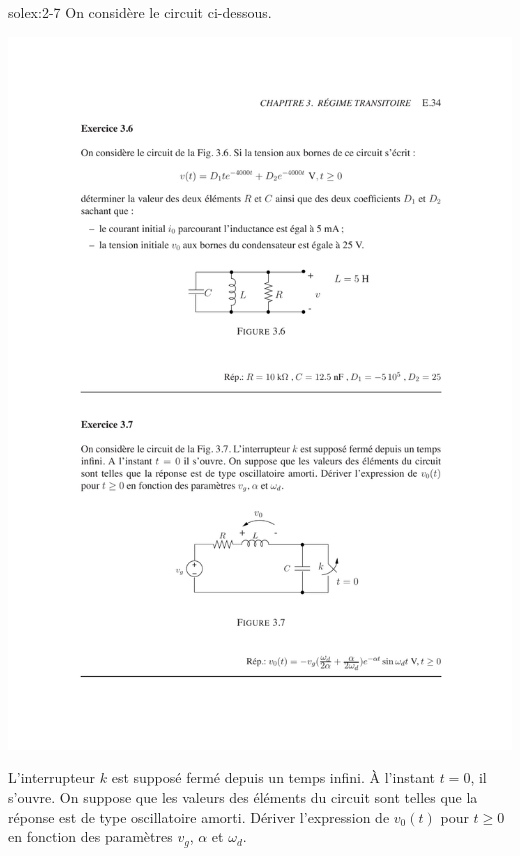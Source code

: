 \begin{exwithsol}{}{solex:2-7}
	\label{ex:2-7}
On consid\`ere le circuit ci-dessous. 
\begin{center}
	\includegraphics[width=0.5\linewidth]{exercices/ex-3-7}
\end{center}
L'interrupteur
$k$ est suppos\'e ferm\'e depuis un temps infini. \`A l'instant $t=0$, il
s'ouvre. On suppose que les valeurs des \'el\'ements du circuit sont telles
que la r\'eponse est de type oscillatoire amorti.  D\'eriver l'expression
de $v_0(t)$ pour $t\geq 0$ en fonction des param\`etres $v_g$, $\alpha$ et 
$\omega_d$.

\end{exwithsol}

